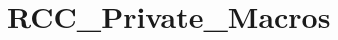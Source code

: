 \hypertarget{group___r_c_c___private___macros}{\section{R\-C\-C\-\_\-\-Private\-\_\-\-Macros}
\label{group___r_c_c___private___macros}
}
